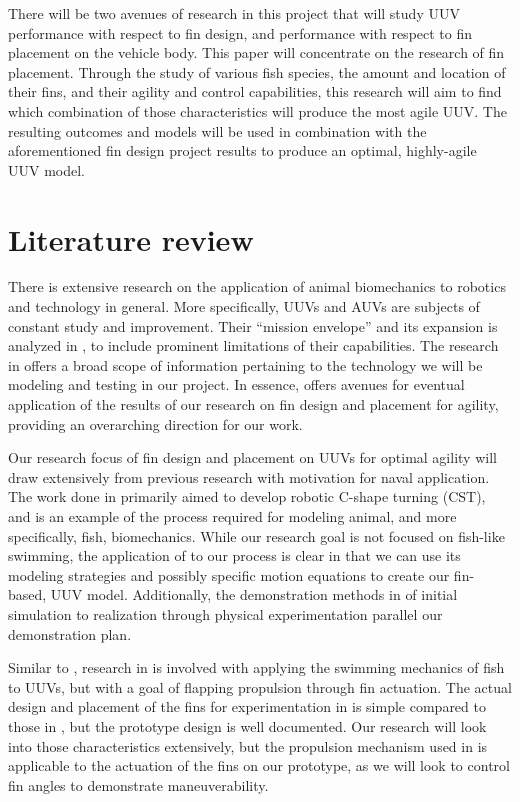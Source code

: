 \documentclass{IEEEtran}
\begin{document}
There will be two avenues of research in this project that will study UUV performance with respect to fin design, and performance with respect to fin placement on the vehicle body. This paper will concentrate on the research of fin placement. Through the study of various fish species, the amount and location of their fins, and their agility and control capabilities, this research will aim to find which combination of those characteristics will produce the most agile UUV. The resulting outcomes and models will be used in combination with the aforementioned fin design project results to produce an optimal, highly-agile UUV model.





\section{Literature review}
There is extensive research on the application of animal biomechanics to robotics and technology in general. More specifically, UUVs and AUVs are subjects of constant study and improvement. Their ``mission envelope'' and its expansion is analyzed in \cite{nrc2005autonomous}, to include prominent limitations of their capabilities. The research in \cite{nrc2005autonomous} offers a broad scope of information pertaining to the technology we will be modeling and testing in our project. In essence, \cite{nrc2005autonomous} offers avenues for eventual application of the results of our research on fin design and placement for agility, providing an overarching direction for our work.

Our research focus of fin design and placement on UUVs for optimal agility will draw extensively from previous research with motivation for naval application. The work done in \cite{noaa2009how} primarily aimed to develop robotic C-shape turning (CST), and is an example of the process required for modeling animal, and more specifically, fish, biomechanics. While our research goal is not focused on fish-like swimming, the application of \cite{noaa2009how} to our process is clear in that we can use its modeling strategies and possibly specific motion equations to create our fin-based, UUV model. Additionally, the demonstration methods in \cite{noaa2009how} of initial simulation to realization through physical experimentation parallel our demonstration plan.

Similar to \cite{noaa2009how}, research in \cite{maslin2020raising} is involved with applying the swimming mechanics of fish to UUVs, but with a goal of flapping propulsion through fin actuation. The actual design and placement of the fins for experimentation in \cite{maslin2020raising} is simple compared to those in \cite{noaa2009how}, but the prototype design is well documented. Our research will look into those characteristics extensively, but the propulsion mechanism used in \cite{maslin2020raising} is applicable to the actuation of the fins on our prototype, as we will look to control fin angles to demonstrate maneuverability.
\end{document}

